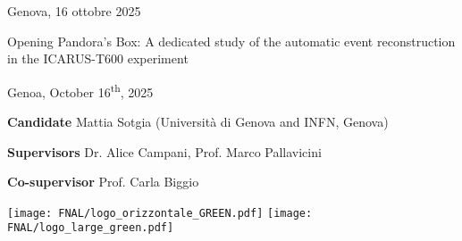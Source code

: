 \begin{titlepage}
\begin{center}
        \vspace{2cm}

		Genova, 16 ottobre 2025
    \end{center}

    \clearpage

    \thispagestyle{empty}
    \phantom{.}
    \vfill

    \noindent Opening Pandora's Box: A dedicated study of the automatic event reconstruction in the ICARUS-T600 experiment

    \noindent Genoa, October 16\textsuperscript{th}, 2025

    \noindent \textbf{Candidate} Mattia Sotgia (Università di Genova and INFN, Genova)

    \noindent \textbf{Supervisors} Dr. Alice Campani, Prof. Marco Pallavicini

    \noindent \textbf{Co-supervisor} Prof. Carla Biggio

    \vspace{1em}

    \noindent \texttt{[image: FNAL/logo\_orizzontale\_GREEN.pdf]}\hspace{1em}
    \texttt{[image: FNAL/logo\_large\_green.pdf]}
\end{titlepage}
